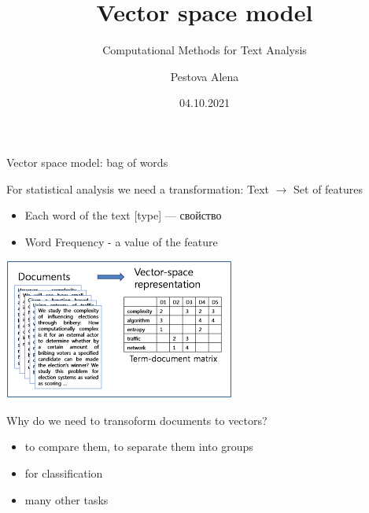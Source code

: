 \documentclass[svgnames]{beamer}
\title[CMTA 04] %
{Vector space model}
\subtitle
{Computational Methods for Text Analysis} %
\author%
{Pestova Alena}
\institute%
{HSE Saint-Petersburg}
\date%
{04.10.2021}
\begin{document}
\begin{frame}
  \titlepage
\end{frame}


\begin{frame}{Vector space model: bag of words}

  \begin{block}{For statistical analysis we need a transformation:}
      Text $\longrightarrow$ Set of features
  \end{block}

  \begin{itemize}
  \item Each word of the text [type] — свойство
  \item Word Frequency - a value of the feature
  \end{itemize}

    \includegraphics[height=.4\textheight]{dtm}
\end{frame}


\begin{frame}
    Why do we need to transoform documents to vectors?
    \begin{itemize}
        \item to compare them, to separate them into groups
        \item for classification
        \item many other tasks
    \end{itemize}
\end{frame}

\end{document}
